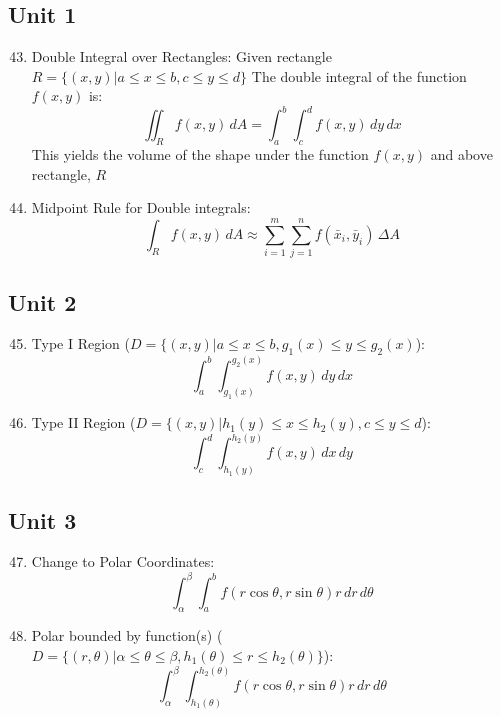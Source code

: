 \documentclass[12pt]{article}
\begin{document}
\subsection{Unit 1}

\begin{enumerate}
    \setcounter{enumi}{42}

  \item Double Integral over Rectangles:
    Given rectangle $R=\{(x,y)\big| a\leq x\leq b, c\leq y\leq d\}$
    The double integral of the function $f(x,y)$ is:
    $$\iint_R f(x,y)\,dA=\int_a^b\int_c^df(x,y)\,dy\,dx$$
    This yields the volume of the shape under the function $f(x,y)$ and above rectangle, $R$

  \item Midpoint Rule for Double integrals:
    $$\int_R f(x,y)\,dA\approx\sum_{i=1}^m\sum_{j=1}^nf(\bar{x}_i,\bar{y}_i)\,\Delta A$$

\end{enumerate}

\subsection{Unit 2}

\begin{enumerate}
    \setcounter{enumi}{44}

  \item Type I Region ($D=\{(x,y)\big|a\leq x\leq b, g_1(x)\leq y\leq g_2(x)$):
      $$\int_a^b\int_{g_1(x)}^{g_2(x)}f(x,y)\,dy\,dx$$

    \item Type II Region ($D=\{(x,y)\big|h_1(y)\leq x\leq h_2(y), c \leq y\leq d$):
      $$\int_c^d\int_{h_1(y)}^{h_2(y)}f(x,y)\,dx\,dy$$

\end{enumerate}

\subsection{Unit 3}

\begin{enumerate}
    \setcounter{enumi}{46}

  \item Change to Polar Coordinates:
    $$\int_{\alpha}^{\beta}\int_a^b f(r\cos\theta,r\sin\theta)r\,dr\,d\theta$$

  \item Polar bounded by function(s) ($D=\{(r,\theta)\big|\alpha\leq\theta\leq\beta, h_1(\theta)\leq r\leq h_2(\theta)\}$):
    $$\int_{\alpha}^{\beta}\int_{h_1(\theta)}^{h_2(\theta)} f(r\cos\theta,r\sin\theta)r\,dr\,d\theta$$

\end{enumerate}
\end{document}
